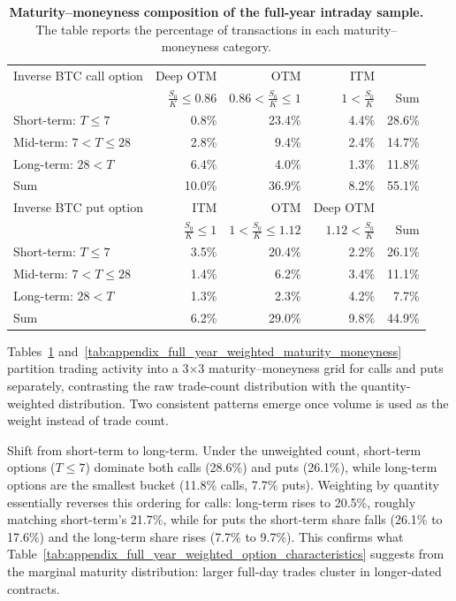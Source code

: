 \documentclass[11pt]{article}
\begin{document}
\begin{table}[h]
\centering
\begin{tabular}{lrrrr}
\hline
Inverse BTC call option & Deep OTM & OTM & ITM & \\
 & $\frac{S_0}{K} \leq 0.86$ & $0.86 < \frac{S_0}{K} \leq 1$ & $1 < \frac{S_0}{K}$ & Sum \\
\hline
Short-term: $T \leq 7$ & 0.8\% & 23.4\% & 4.4\% & 28.6\% \\
Mid-term: $7 < T \leq 28$ & 2.8\% & 9.4\% & 2.4\% & 14.7\% \\
Long-term: $28 < T$ & 6.4\% & 4.0\% & 1.3\% & 11.8\% \\
Sum & 10.0\% & 36.9\% & 8.2\% & 55.1\% \\
\hline
Inverse BTC put option & ITM & OTM & Deep OTM & \\
 & $\frac{S_0}{K} \leq 1$ & $1 < \frac{S_0}{K} \leq 1.12$ &  $1.12 < \frac{S_0}{K}$ & Sum \\
\hline
Short-term: $T \leq 7$ & 3.5\% & 20.4\% & 2.2\% & 26.1\% \\
Mid-term: $7 < T \leq 28$ & 1.4\% & 6.2\% & 3.4\% & 11.1\% \\
Long-term: $28 < T$ & 1.3\% & 2.3\% & 4.2\% & 7.7\% \\
Sum & 6.2\% & 29.0\% & 9.8\% & 44.9\% \\
\hline
\end{tabular}
\caption{\textbf{Maturity--moneyness composition of the full-year intraday sample.} The table reports the percentage of transactions in each maturity--moneyness category.}
\label{tab:appendix_full_year_maturity_moneyness}

\end{table}

Tables~\ref{tab:appendix_full_year_maturity_moneyness} and~\ref{tab:appendix_full_year_weighted_maturity_moneyness} partition trading activity into a 3$\times$3 maturity--moneyness grid for calls and puts separately, contrasting the raw trade-count distribution with the quantity-weighted distribution. Two consistent patterns emerge once volume is used as the weight instead of trade count.

Shift from short-term to long-term. Under the unweighted count, short-term options ($T\le 7$) dominate both calls (28.6\%) and puts (26.1\%), while long-term options are the smallest bucket (11.8\% calls, 7.7\% puts). Weighting by quantity essentially reverses this ordering for calls: long-term rises to 20.5\%, roughly matching short-term's 21.7\%, while for puts the short-term share falls (26.1\% to 17.6\%) and the long-term share rises (7.7\% to 9.7\%). This confirms what Table~\ref{tab:appendix_full_year_weighted_option_characteristics} suggests from the marginal maturity distribution: larger full-day trades cluster in longer-dated contracts.
\end{document}
